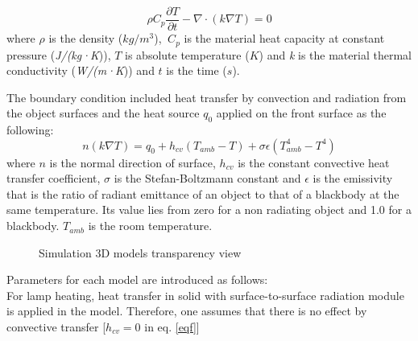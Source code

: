 \documentclass{tQRT2e}
\begin{document}
\begin{equation}
\rho C_p \frac{\partial T}{\partial t}-\nabla \cdot (k\nabla T) = 0
\end{equation}
where $\rho$ is the density (\textit{$kg/m^3$}),   $C_p$ is the material heat capacity at constant pressure (\textit{J/(kg·K})), $ T $ is absolute temperature ($ K $) and \textit{k} is the material thermal conductivity (\textit{W/(m·K})) and $ t $ is the time ($s$).

The boundary condition included heat transfer by convection and radiation from the object surfaces and the  heat  source $q_0$  applied on the front surface as the following: 
\begin{equation}
n(k\nabla T) = q_0 + h_{cv}(T_{amb}-T)+\sigma \epsilon(T_{amb}^4-T^4)
\label{eqf}
\end{equation}
where $n$ is the normal direction of surface, $ h_{cv} $ is the constant convective heat transfer coefficient, $\sigma$ is the Stefan-Boltzmann constant  and $\epsilon$ is the emissivity that is the ratio of radiant emittance of an object to that of a blackbody at the same temperature. Its value lies from zero for a non radiating object and 1.0 for a blackbody. $ T_{amb} $ is the room temperature.

\begin{figure}[ht]
    \hspace{-8pt}
    \hspace{-5pt}
	\caption{Simulation 3D models transparency view}
	\label{models}
\end{figure}
Parameters for each model are introduced as follows:\\
For lamp heating, heat transfer in solid with surface-to-surface radiation module is applied in the model. Therefore, one assumes that there is no effect by convective transfer [$h_{cv}=0$ in eq. \ref{eqf}]
\end{document}
